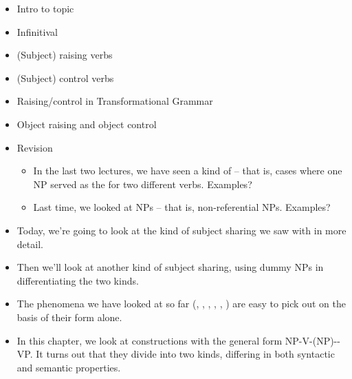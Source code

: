 \documentclass[a4paper,landscape,headrule,footrule]{foils}
\begin{document}
\maketitle

%



\begin{itemize}
\item Intro to topic
\item Infinitival 
\item (Subject) raising verbs
\item (Subject) control verbs
\item Raising/control in Transformational Grammar
\item Object raising and object control
\end{itemize}


\begin{itemize}
\item Revision
  \begin{itemize}
  \item In the last two lectures, we have seen a kind of 
     -- that is, cases where one NP 
    served as the  for two different verbs.  
    Examples?
  \item Last time, we looked at  NPs --  that is, 
    non-referential NPs.  Examples?
  \end{itemize}
\item Today, we’re going to look at the kind of subject 
sharing we saw with  in more detail.
\item Then we’ll look at another kind of subject 
sharing, using dummy NPs in differentiating the 
two kinds.
\end{itemize}


\begin{itemize}
\item The phenomena we have looked at so far (,
  , , ,
  , ) are easy to pick out on the
  basis of their form alone.
\item In this chapter, we look at constructions with the general form
  NP-V-(NP)--VP.  It turns out that they divide into two
  kinds, differing in both syntactic and semantic properties.
\end{itemize}
\end{document}
